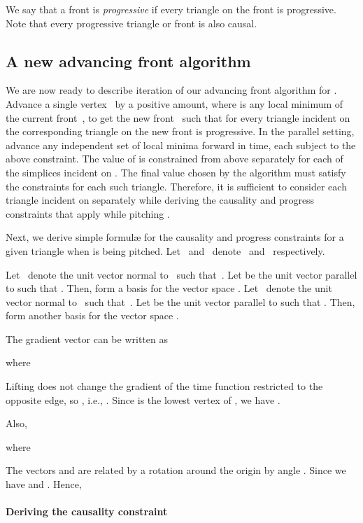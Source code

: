 \documentclass[twocolumn]{article}
\begin{document}
We say that a front  is \emph{progressive} if every triangle on the
front is progressive.  Note that every progressive triangle or front
is also causal.




\subsection{A new advancing front algorithm}

We are now ready to describe iteration  of our advancing front
algorithm for .  Advance a single vertex~ by a positive
amount, where  is any local minimum of the current front~, to
get the new front~ such that for every triangle 
incident on  the corresponding triangle on the new front 
is progressive.  In the parallel setting, advance any independent set
of local minima forward in time, each subject to the above constraint.
The value of  is constrained from above separately for
each of the simplices incident on .  The final value chosen by the
algorithm must satisfy the constraints for each such triangle.
Therefore, it is sufficient to consider each triangle  incident
on  separately while deriving the causality and progress
constraints that apply while pitching .

Next, we derive simple formul\ae{} for the causality and progress
constraints for a given triangle  when  is
being pitched.  Let~ and~
denote~
and~ respectively.

Let~ denote the unit vector normal to~ such
that~.  Let 
be the unit vector parallel to  such that .  Then,  form
a basis for the vector space .  Let~ denote the
unit vector normal to~ such that~.  Let  be the unit vector parallel to 
such that .  Then,
 form another basis for the vector
space .

The gradient vector  can be written as

where

Lifting  does not change the gradient of the time function
restricted to the opposite edge, so , i.e., .  Since  is the lowest vertex of , we have .

Also,

where

The vectors  and  are related by a rotation
around the origin by angle .  Since  we have
 and .  Hence,




\paragraph{Deriving the causality constraint}
\end{document}
